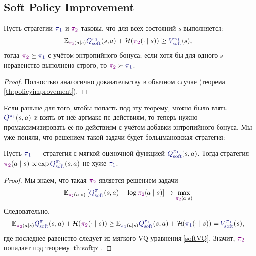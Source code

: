 \subsection{Soft Policy Improvement}

\begin{theoremBox}[label=th:softpi]{}
Пусть стратегии $\textcolor{ChadBlue}{\pi_1}$ и $\textcolor{ChadPurple}{\pi_2}$ таковы, что для всех состояний $s$ выполняется:
$$\E_{\textcolor{ChadPurple}{\pi_2}(a \mid s)} \textcolor{ChadBlue}{Q^{\pi_1}_{\soft}}(s, a) + \entropy(\textcolor{ChadPurple}{\pi_2}(\cdot \mid s)) \ge \textcolor{ChadBlue}{V^{\pi_1}_{\soft}}(s),$$
тогда $\textcolor{ChadPurple}{\pi_2} \succeq \textcolor{ChadBlue}{\pi_1}$ с учётом энтропийного бонуса; если хотя бы для одного $s$ неравенство выполнено строго, то $\textcolor{ChadPurple}{\pi_2} \succ \textcolor{ChadBlue}{\pi_1}$.
\begin{proof}
Полностью аналогично доказательству в обычном случае (теорема \ref{th:policyimprovement}).
\end{proof}
\end{theoremBox}

Если раньше для того, чтобы попасть под эту теорему, можно было взять $\textcolor{ChadBlue}{Q^{\pi_1}}(s, a)$ и взять от неё аргмакс по действиям, то теперь нужно промаксимизировать её по действиям с учётом добавки энтропийного бонуса. Мы уже поняли, что решением такой задачи будет больцмановская стратегия:

\begin{theorem}
Пусть $\textcolor{ChadBlue}{\pi_1}$ --- стратегия с мягкой оценочной функцией $\textcolor{ChadBlue}{Q^{\pi_1}_{\soft}}(s, a)$. Тогда стратегия $\textcolor{ChadPurple}{\pi_2}(a \mid s) \propto \exp \textcolor{ChadBlue}{Q^{\pi_1}_{\soft}}(s, a)$ не хуже $\textcolor{ChadBlue}{\pi_1}$.
\begin{proof}
Мы знаем, что такая $\textcolor{ChadPurple}{\pi_2}$ является решением задачи
$$\E_{\textcolor{ChadPurple}{\pi_2}(a \mid s)} \left[ \textcolor{ChadBlue}{Q^{\pi_1}_{\soft}}(s, a) - \log \textcolor{ChadPurple}{\pi_2}(a \mid s) \right] \to \max\limits_{\textcolor{ChadPurple}{\pi_2}(a \mid s)}
$$
Следовательно,
$$\E_{\textcolor{ChadPurple}{\pi_2}(a \mid s)} \textcolor{ChadBlue}{Q^{\pi_1}_{\soft}}(s, a) + \entropy(\textcolor{ChadPurple}{\pi_2}(\cdot \mid s)) \ge \E_{\textcolor{ChadBlue}{\pi_1}(a \mid s)} \textcolor{ChadBlue}{Q^{\pi_1}_{\soft}}(s, a) + \entropy(\textcolor{ChadBlue}{\pi_1}(\cdot \mid s)) = \textcolor{ChadBlue}{V^{\pi_1}_{\soft}}(s),$$
где последнее равенство следует из мягкого VQ уравнения \eqref{softVQ}. Значит, $\textcolor{ChadPurple}{\pi_2}$ попадает под теорему \ref{th:softpi}.
\end{proof}
\end{theorem}

